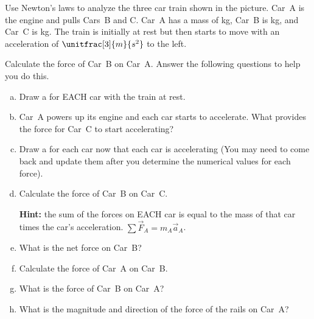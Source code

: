 \label{fnt8.1.1-3}

Use Newton's laws to analyze the three car train shown in the picture. Car~A is the engine and pulls Cars~B and C. Car~A has a mass of \unit[10000]{kg}, Car~B is \unit[8000]{kg}, and Car~C is \unit[5000]{kg}. The train is initially at rest but then starts to move with an acceleration of $\unitfrac[3]{m}{s^2}$ to the left.

Calculate the force of Car~B on Car~A. Answer the following questions to help you do this.

\begin{enumerate}[(a)]
	\item Draw a \forcediag{} for EACH car with the train at rest.

	\item Car~A powers up its engine and each car starts to accelerate. What provides the force for Car~C to start accelerating?

	\item Draw a \forcediag{} for each car now that each car is accelerating (You may need to come back and update them after you determine the numerical values for each force).

	\item Calculate the force of Car~B on Car~C. 
		
		\textbf{Hint:} the sum of the forces on EACH car is equal to the mass of that car times the car's acceleration. $\sum \vec{F}_A = m_A \vec{a}_A$.
	
	\item What is the net force on Car~B?
	
	\item Calculate the force of Car~A on Car~B.
	
	\item What is the force of Car~B on Car~A?
	
	\item What is the magnitude and direction of the force of the rails on Car~A?
\end{enumerate}